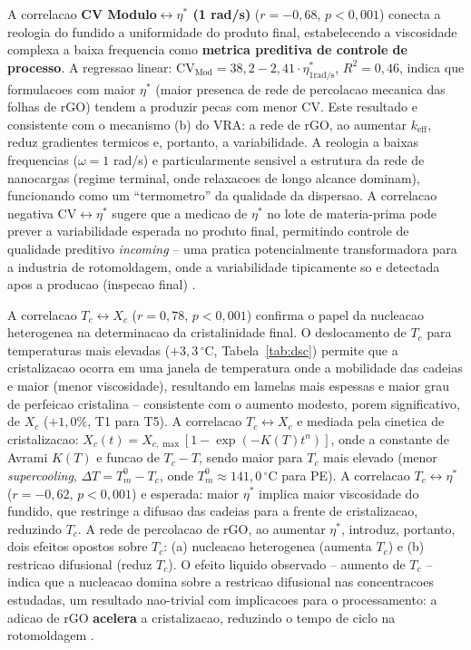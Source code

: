 \documentclass[11pt,a4paper,oneside]{article}
\begin{document}
A correlacao {\bfseries CV Modulo${\leftrightarrow}\eta^*$ (1 rad/s)} ($r{=}{-}0{,}68$, $p{<}0{,}001$) conecta a reologia do fundido a uniformidade do produto final, estabelecendo a viscosidade complexa a baixa frequencia como {\bfseries metrica preditiva de controle de processo}. A regressao linear: $\text{CV}_{\text{Mod}}{=}38{,}2{-}2{,}41{\cdot}\eta^*_{1\text{rad/s}}$, $R^2{=}0{,}46$, indica que formulacoes com maior $\eta^*$ (maior presenca de rede de percolacao mecanica das folhas de rGO) tendem a produzir pecas com menor CV. Este resultado e consistente com o mecanismo (b) do VRA: a rede de rGO, ao aumentar $k_{\text{eff}}$, reduz gradientes termicos e, portanto, a variabilidade. A reologia a baixas frequencias ($\omega{=}1$ rad/s) e particularmente sensivel a estrutura da rede de nanocargas (regime terminal, onde relaxacoes de longo alcance dominam), funcionando como um ``termometro'' da qualidade da dispersao. A correlacao negativa CV${\leftrightarrow}\eta^*$ sugere que a medicao de $\eta^*$ no lote de materia-prima pode prever a variabilidade esperada no produto final, permitindo controle de qualidade preditivo \textit{incoming} -- uma pratica potencialmente transformadora para a industria de rotomoldagem, onde a variabilidade tipicamente so e detectada apos a producao (inspecao final) \cite{Montgomery2020}.

A correlacao {\bfseries $T_c{\leftrightarrow}X_c$} ($r{=}0{,}78$, $p{<}0{,}001$) confirma o papel da nucleacao heterogenea na determinacao da cristalinidade final. O deslocamento de $T_c$ para temperaturas mais elevadas ($+3{,}3\,^{\circ}$C, Tabela~\ref{tab:dsc}) permite que a cristalizacao ocorra em uma janela de temperatura onde a mobilidade das cadeias e maior (menor viscosidade), resultando em lamelas mais espessas e maior grau de perfeicao cristalina -- consistente com o aumento modesto, porem significativo, de $X_c$ ($+1{,}0\%$, T1 para T5). A correlacao $T_c{\leftrightarrow}X_c$ e mediada pela cinetica de cristalizacao: $X_c(t){=}X_{c,\max}[1{-}\exp({-}K(T)t^n)]$, onde a constante de Avrami $K(T)$ e funcao de $T_c{-}T$, sendo maior para $T_c$ mais elevado (menor \textit{supercooling}, $\Delta T{=}T_m^0{-}T_c$, onde $T_m^0{\approx}141{,}0\,^{\circ}$C para PE). A correlacao $T_c{\leftrightarrow}\eta^*$ ($r{=}{-}0{,}62$, $p{<}0{,}001$) e esperada: maior $\eta^*$ implica maior viscosidade do fundido, que restringe a difusao das cadeias para a frente de cristalizacao, reduzindo $T_c$. A rede de percolacao de rGO, ao aumentar $\eta^*$, introduz, portanto, dois efeitos opostos sobre $T_c$: (a) nucleacao heterogenea (aumenta $T_c$) e (b) restricao difusional (reduz $T_c$). O efeito liquido observado -- aumento de $T_c$ -- indica que a nucleacao domina sobre a restricao difusional nas concentracoes estudadas, um resultado nao-trivial com implicacoes para o processamento: a adicao de rGO {\bfseries acelera} a cristalizacao, reduzindo o tempo de ciclo na rotomoldagem \cite{Kim2010}.
\end{document}
